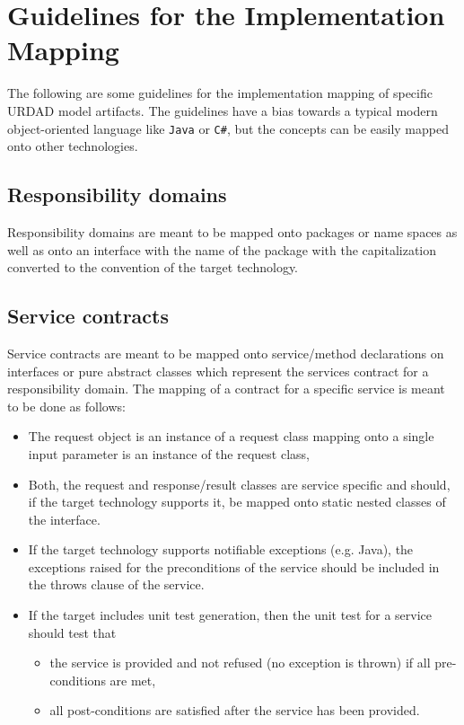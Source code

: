 \section{Guidelines for the Implementation Mapping}

The following are some guidelines for the implementation mapping of specific URDAD model artifacts. The guidelines have a bias towards a typical modern object-oriented language like \verb+Java+ or \verb+C#+, but the concepts can be easily mapped onto other technologies.

\subsection{Responsibility domains}

Responsibility domains are meant to be mapped onto packages or name spaces as well as onto an interface with the name of the package with the capitalization converted to the convention of the target technology. 

\subsection{Service contracts}

Service contracts are meant to be mapped onto service/method declarations on interfaces or pure abstract classes which represent the services contract for a responsibility domain. The mapping of a contract for a specific service is meant to be done as follows:
\begin{itemize}
  \item The request object is an instance of a request class mapping onto a single input parameter is an instance of the request class,
  \item Both, the request and response/result classes are service specific and should, if the target technology supports it, be mapped onto static nested classes of the interface.
  \item If the target technology supports notifiable exceptions (e.g. Java), the exceptions raised for the preconditions of the service should be included in the throws clause of the service.
  \item If the target includes unit test generation, then the unit test for a service should test that
    \begin{itemize}
      \item the service is provided and not refused (no exception is thrown) if all pre-conditions are met,
      \item all post-conditions are satisfied after the service has been provided.
    \end{itemize}
\end{itemize}

